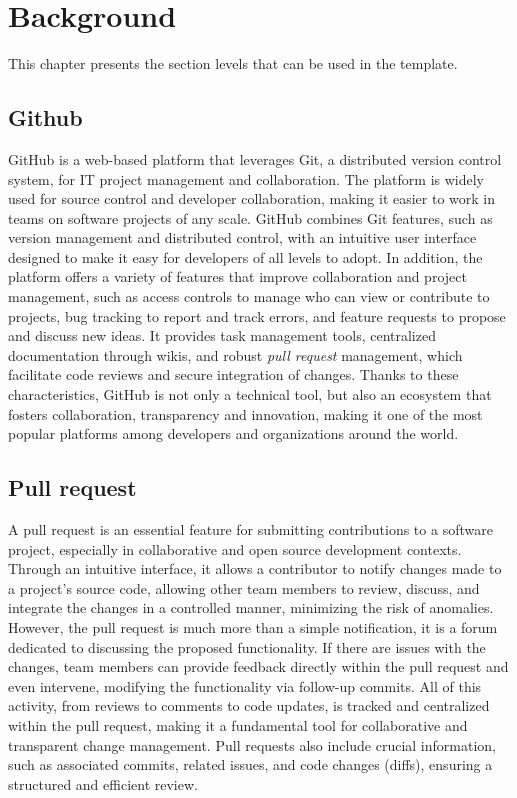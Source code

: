 \chapter{Background}
\thispagestyle{plain}


This chapter presents the section levels that can be used in the template. 


\section{Github}
GitHub is a web-based platform that leverages Git, a distributed version control system, for IT project management and collaboration. 
The platform is widely used for source control and developer collaboration, making it easier to work in teams on software projects of any scale.
GitHub combines Git features, such as version management and distributed control, with an intuitive user interface designed to make it easy for developers of all levels to adopt.
In addition, the platform offers a variety of features that improve collaboration and project management, such as access controls to manage who can view or contribute to projects,
bug tracking to report and track errors, and feature requests to propose and discuss new ideas.
It provides task management tools, centralized documentation through wikis, and robust \textit{pull request} management, which facilitate code reviews and secure integration of changes.
Thanks to these characteristics, GitHub is not only a technical tool, but also an ecosystem that fosters collaboration, transparency and innovation, making it one of the most popular platforms among developers and organizations around the world.
\section{Pull request}
A pull request is an essential feature for submitting contributions to a software project, especially in collaborative and open source development contexts.
Through an intuitive interface, it allows a contributor to notify changes made to a project's source code, allowing other team members to review, discuss, and integrate the changes in a controlled manner, minimizing the risk of anomalies.
However, the pull request is much more than a simple notification, it is a forum dedicated to discussing the proposed functionality.
If there are issues with the changes, team members can provide feedback directly within the pull request and even intervene, modifying the functionality via follow-up commits.
All of this activity, from reviews to comments to code updates, is tracked and centralized within the pull request, making it a fundamental tool for collaborative and transparent change management.
Pull requests also include crucial information, such as associated commits, related issues, and code changes (diffs), ensuring a structured and efficient review.
